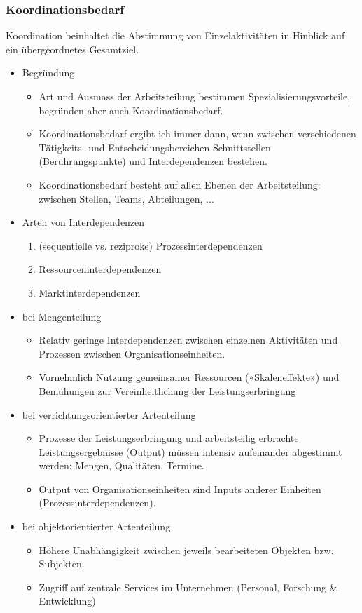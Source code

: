 \subsubsection{Koordinationsbedarf}
Koordination beinhaltet die Abstimmung von Einzelaktivitäten in Hinblick auf ein übergeordnetes Gesamtziel.
\begin{itemize}
	\item Begründung
	\begin{itemize}
		\item Art und Ausmass der Arbeitsteilung bestimmen Spezialisierungsvorteile, begründen aber auch Koordinationsbedarf.
		\item Koordinationsbedarf ergibt ich immer dann, wenn zwischen verschiedenen Tätigkeits- und Entscheidungsbereichen
		Schnittstellen (Berührungspunkte) und Interdependenzen bestehen.
		\item Koordinationsbedarf besteht auf allen Ebenen der Arbeitsteilung: zwischen Stellen, Teams, Abteilungen, ...
	\end{itemize}
	\item Arten von Interdependenzen
	\begin{enumerate}
		\item (sequentielle vs. reziproke) Prozessinterdependenzen
		\item Ressourceninterdependenzen
		\item Marktinterdependenzen
	\end{enumerate}
	\item bei Mengenteilung
	\begin{itemize}
		\item Relativ geringe Interdependenzen zwischen einzelnen Aktivitäten und Prozessen zwischen Organisationseinheiten.
		\item Vornehmlich Nutzung gemeinsamer Ressourcen («Skaleneffekte») und Bemühungen zur Vereinheitlichung der Leistungserbringung
	\end{itemize}
	\item bei verrichtungsorientierter Artenteilung
	\begin{itemize}
		\item Prozesse der Leistungserbringung und arbeitsteilig erbrachte Leistungsergebnisse (Output) müssen intensiv aufeinander abgestimmt werden: Mengen, Qualitäten, Termine.
		\item Output von Organisationseinheiten sind Inputs anderer Einheiten (Prozessinterdependenzen).
	\end{itemize}
	\item bei objektorientierter Artenteilung
	\begin{itemize}
		\item Höhere Unabhängigkeit zwischen jeweils bearbeiteten Objekten bzw. Subjekten.
		\item Zugriff auf zentrale Services im Unternehmen (Personal, Forschung \& Entwicklung)
	\end{itemize}
\end{itemize}

